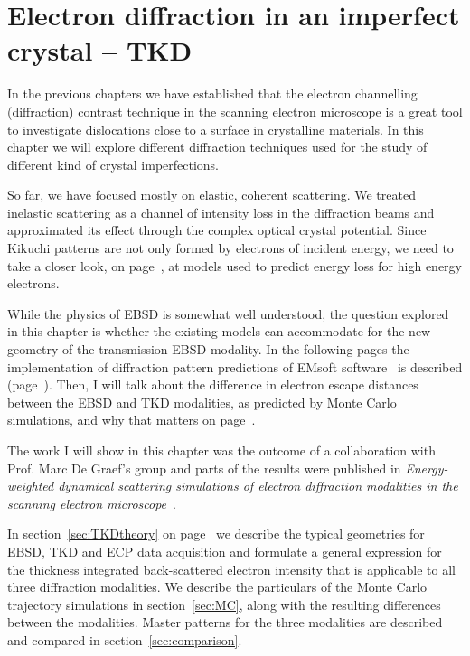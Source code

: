 \chapter{Electron diffraction in an imperfect crystal -- TKD}
\label{chap:TKD}
In the previous chapters we have established that the electron channelling (diffraction) contrast  technique in the scanning electron microscope is a great tool to investigate dislocations close to a surface in crystalline materials. In this chapter we will explore different diffraction techniques used for the study of different kind of crystal imperfections. 



So far, we have focused mostly on elastic, coherent scattering. We treated inelastic scattering as a channel of intensity loss in the diffraction beams and approximated its effect through the complex optical crystal potential. Since Kikuchi patterns are not only formed by electrons of incident energy, we need to take a closer look, on page~\pageref{sec:scatter}, at models used to predict energy loss for high energy electrons.


While the physics of EBSD is somewhat well understood, the question explored in this chapter is whether the existing models can accommodate for the new geometry of the transmission-EBSD modality. In the following pages the implementation of diffraction pattern predictions of EMsoft software~\cite{EMsoftpaper} is described (page~\pageref{sec:TKDtheory}). Then, I will talk about the difference in electron escape distances between the EBSD and TKD modalities, as predicted by Monte Carlo simulations, and why that matters on page~\pageref{sec:MC}. 


The work I will show in this chapter was the outcome of a collaboration with Prof. Marc De Graef's group and parts of the results were published in \textit{Energy-weighted dynamical scattering simulations of electron diffraction modalities in the scanning electron microscope}~\cite{PascalTKD}.

In section~\ref{sec:TKDtheory} on page~\pageref{sec:TKDtheory} we describe the typical geometries for EBSD, TKD and ECP data acquisition and formulate a general expression for the thickness integrated back-scattered electron intensity that is applicable to all three diffraction modalities. We describe the particulars of the Monte Carlo trajectory simulations in section~\ref{sec:MC}, along with the resulting differences between the modalities. Master patterns for the three modalities are described and compared in section~\ref{sec:comparison}. 



